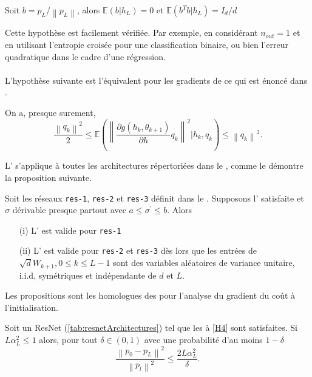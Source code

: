 \begin{assumption}\label{H3}
    Soit $ b= p_L / \left\| p_L \right\|  $, alors $ \mathbb{E}(b | h_L) = 0 $ et $ \mathbb{E}(b^T b | h_L) = I_d / d $
\end{assumption}
Cette hypothèse est facilement vérifiée. Par exemple, en considérant $n_{out} = 1$ et en utilisant l'entropie croisée pour une classification binaire, ou bien l'erreur quadratique dans le cadre d'une régression.\\\\
L'hypothèse suivante est l'équivalent pour les gradients de ce qui est énoncé dans .
\begin{assumption}\label{H4}
    On a, presque surement, 
    \[
        \frac{\left\| q_k \right\| ^2}{2} \leqslant \mathbb{E}\left(\left\| \frac{\partial g(h_k, \theta _{k+1})}{\partial h} q_k  \right\| ^2 | h_k, q_k \right) \leqslant \left\| q_k \right\| ^2
    .\]
\end{assumption}
L' s'applique à toutes les architectures répertoriées dans le , comme le démontre la proposition suivante.
\begin{proposition}\label{prop5}
    Soit les réseaux \texttt{res-1}, \texttt{res-2} et \texttt{res-3} définit dans le . Supposons l' satisfaite et $ \sigma  $ dérivable presque partout avec $ a \leqslant \sigma ^\prime \leqslant b $. Alors
    \begin{itemize}
        \item [(i)] L' est valide pour \texttt{res-1}
        \item [(ii)] L' est valide pour \texttt{res-2} et \texttt{res-3} dès lors que les entrées de $ \sqrt{d} W_{k+1}, 0 \leqslant k \leqslant L-1 $ sont des variables aléatoires de variance unitaire, i.i.d, symétriques et indépendante de $ d $ et $ L $.
    \end{itemize}
\end{proposition}
Les propositions  sont les homologues des  pour l'analyse du gradient du coût à l'initialisation.
\begin{proposition}\label{prop6}
    Soit un ResNet (\ref{tab:resnetArchitectures}) tel que les  à \ref{H4} sont satisfaites. Si $ L \alpha _L ^2 \leqslant 1 $ alors, pour tout $ \delta \in (0,1) $ avec une probabilité d'au moins $ 1 - \delta  $ 
    \[
        \frac{\left\| p_0 - p_L \right\| ^2 }{\left\| p_l \right\| ^2 } \leqslant \frac{2 L \alpha _L ^2}{\delta }
    .\]
\end{proposition}

